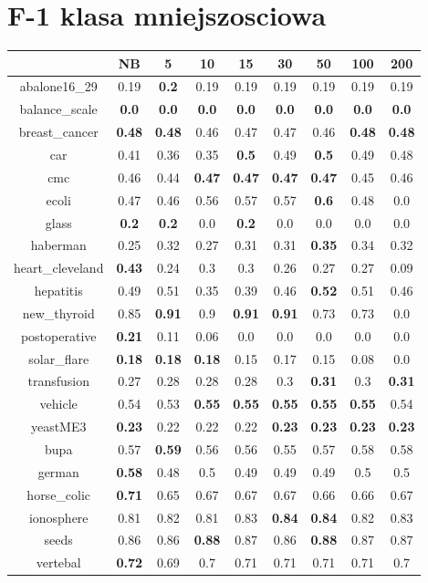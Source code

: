\documentclass{article}%
\begin{document}
%
\section*{F{-}1 klasa mniejszosciowa}%
\begin{tabular}{c|cccccccc}%
\hline%
&NB&5&10&15&30&50&100&200\\%
\hline%
abalone16\_29&0.19&\textbf{0.2}&0.19&0.19&0.19&0.19&0.19&0.19\\%
\hline%
balance\_scale&\textbf{0.0}&\textbf{0.0}&\textbf{0.0}&\textbf{0.0}&\textbf{0.0}&\textbf{0.0}&\textbf{0.0}&\textbf{0.0}\\%
\hline%
breast\_cancer&\textbf{0.48}&\textbf{0.48}&0.46&0.47&0.47&0.46&\textbf{0.48}&\textbf{0.48}\\%
\hline%
car&0.41&0.36&0.35&\textbf{0.5}&0.49&\textbf{0.5}&0.49&0.48\\%
\hline%
cmc&0.46&0.44&\textbf{0.47}&\textbf{0.47}&\textbf{0.47}&\textbf{0.47}&0.45&0.46\\%
\hline%
ecoli&0.47&0.46&0.56&0.57&0.57&\textbf{0.6}&0.48&0.0\\%
\hline%
glass&\textbf{0.2}&\textbf{0.2}&0.0&\textbf{0.2}&0.0&0.0&0.0&0.0\\%
\hline%
haberman&0.25&0.32&0.27&0.31&0.31&\textbf{0.35}&0.34&0.32\\%
\hline%
heart\_cleveland&\textbf{0.43}&0.24&0.3&0.3&0.26&0.27&0.27&0.09\\%
\hline%
hepatitis&0.49&0.51&0.35&0.39&0.46&\textbf{0.52}&0.51&0.46\\%
\hline%
new\_thyroid&0.85&\textbf{0.91}&0.9&\textbf{0.91}&\textbf{0.91}&0.73&0.73&0.0\\%
\hline%
postoperative&\textbf{0.21}&0.11&0.06&0.0&0.0&0.0&0.0&0.0\\%
\hline%
solar\_flare&\textbf{0.18}&\textbf{0.18}&\textbf{0.18}&0.15&0.17&0.15&0.08&0.0\\%
\hline%
transfusion&0.27&0.28&0.28&0.28&0.3&\textbf{0.31}&0.3&\textbf{0.31}\\%
\hline%
vehicle&0.54&0.53&\textbf{0.55}&\textbf{0.55}&\textbf{0.55}&\textbf{0.55}&\textbf{0.55}&0.54\\%
\hline%
yeastME3&\textbf{0.23}&0.22&0.22&0.22&\textbf{0.23}&\textbf{0.23}&\textbf{0.23}&\textbf{0.23}\\%
\hline%
bupa&0.57&\textbf{0.59}&0.56&0.56&0.55&0.57&0.58&0.58\\%
\hline%
german&\textbf{0.58}&0.48&0.5&0.49&0.49&0.49&0.5&0.5\\%
\hline%
horse\_colic&\textbf{0.71}&0.65&0.67&0.67&0.67&0.66&0.66&0.67\\%
\hline%
ionosphere&0.81&0.82&0.81&0.83&\textbf{0.84}&\textbf{0.84}&0.82&0.83\\%
\hline%
seeds&0.86&0.86&\textbf{0.88}&0.87&0.86&\textbf{0.88}&0.87&0.87\\%
\hline%
vertebal&\textbf{0.72}&0.69&0.7&0.71&0.71&0.71&0.71&0.7\\%
\hline%
\end{tabular}
\end{document}
